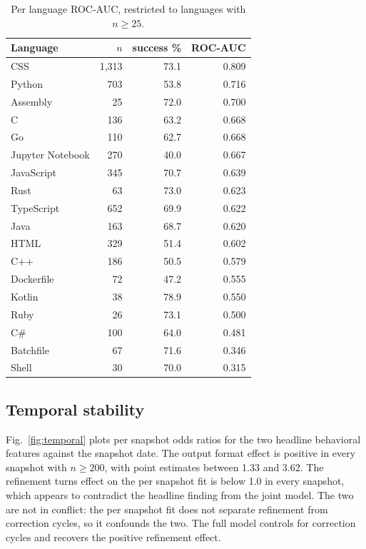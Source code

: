 \documentclass[conference]{IEEEtran}
\begin{document}
\begin{table}[t]
\centering
\caption{Per language ROC-AUC, restricted to languages with $n \geq 25$.}
\label{tab:lang}
\footnotesize
\begin{tabular}{lrrr}
\toprule
Language & $n$ & success \% & ROC-AUC \\
\midrule
CSS & 1{,}313 & 73.1 & 0.809 \\
Python & 703 & 53.8 & 0.716 \\
Assembly & 25 & 72.0 & 0.700 \\
C & 136 & 63.2 & 0.668 \\
Go & 110 & 62.7 & 0.668 \\
Jupyter Notebook & 270 & 40.0 & 0.667 \\
JavaScript & 345 & 70.7 & 0.639 \\
Rust & 63 & 73.0 & 0.623 \\
TypeScript & 652 & 69.9 & 0.622 \\
Java & 163 & 68.7 & 0.620 \\
HTML & 329 & 51.4 & 0.602 \\
C++ & 186 & 50.5 & 0.579 \\
Dockerfile & 72 & 47.2 & 0.555 \\
Kotlin & 38 & 78.9 & 0.550 \\
Ruby & 26 & 73.1 & 0.500 \\
C\# & 100 & 64.0 & 0.481 \\
Batchfile & 67 & 71.6 & 0.346 \\
Shell & 30 & 70.0 & 0.315 \\
\bottomrule
\end{tabular}
\end{table}

\subsection{Temporal stability}
Fig.~\ref{fig:temporal} plots per snapshot odds ratios for the two headline behavioral features against the snapshot date. The output format effect is positive in every snapshot with $n \geq 200$, with point estimates between 1.33 and 3.62. The refinement turns effect on the per snapshot fit is below 1.0 in every snapshot, which appears to contradict the headline finding from the joint model. The two are not in conflict: the per snapshot fit does not separate refinement from correction cycles, so it confounds the two. The full model controls for correction cycles and recovers the positive refinement effect.
\end{document}
